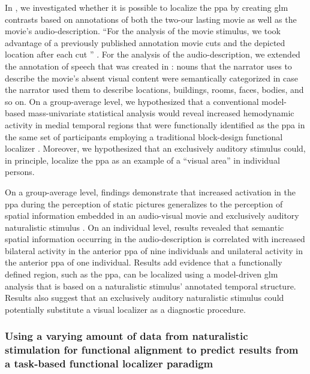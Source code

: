 In \citet{haeusler2022processing}, we investigated whether it is possible to
localize the \ac{ppa} by creating \ac{glm} contrasts based on annotations of
both the two-our lasting movie as well as the movie's audio-description.
``For the analysis of the movie stimulus, we took advantage of a previously
published annotation movie cuts and the depicted location after each cut
\citep{haeusler2016cutanno}'' \citep{haeusler2022processing}.
For the analysis of the audio-description, we extended the annotation of speech
that was created in \citet{haeusler2021speechanno}:
%
nouns that the narrator uses to describe the movie's absent visual content were
semantically categorized in case the narrator used them to describe locations,
buildings, rooms, faces, bodies, and so on.
On a group-average level, we hypothesized that a conventional model-based
mass-univariate statistical analysis would reveal increased hemodynamic activity
in medial temporal regions that were functionally identified as the \ac{ppa} in
the same set of participants employing a traditional block-design functional
localizer \citep{sengupta2016extension}.
Moreover, we hypothesized that an exclusively auditory stimulus could, in
principle, localize the \ac{ppa} as an example of a ``visual area'' in
individual persons.

On a group-average level, findings demonstrate that increased activation in the
\ac{ppa} during the perception of static pictures generalizes to the perception
of spatial information embedded in an audio-visual movie and exclusively
auditory naturalistic stimulus \citep{haeusler2022processing}.
On an individual level, results revealed that semantic spatial information
occurring in the audio-description is correlated with increased bilateral
activity in the anterior \ac{ppa} of nine individuals and unilateral activity in
the anterior \ac{ppa} of one individual.
Results add evidence \citep[cf.][]{bartels2004mapping} that a functionally
defined region, such as the \ac{ppa}, can be localized using a model-driven
\ac{glm} analysis that is based on a naturalistic stimulus' annotated temporal
structure.
Results also suggest that an exclusively auditory naturalistic stimulus could
potentially substitute a visual localizer as a diagnostic procedure.



\subsubsection{Using a varying amount of data from naturalistic stimulation for
functional alignment to predict results from a task-based functional localizer
paradigm}

